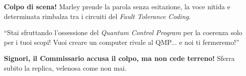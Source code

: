 \begin{center}
\begin{minipage}{0.7\textwidth}
    \centering
\end{minipage}
\end{center}

\textbf{Colpo di scena!} Marley prende la parola senza esitazione, la voce nitida e determinata rimbalza tra i circuiti del \emph{Fault Tolerance Coding}.

\begin{dialogue}  \enquote{Stai sfruttando l'ossessione del \textit{Quantum Control Program} per la coerenza solo per i tuoi scopi! Vuoi creare un computer rivale al QMP... e noi ti fermeremo!} \end{dialogue}

\textbf{Signori, il Commissario accusa il colpo, ma non cede terreno!} Sferra subito la replica, velenosa come non mai.

